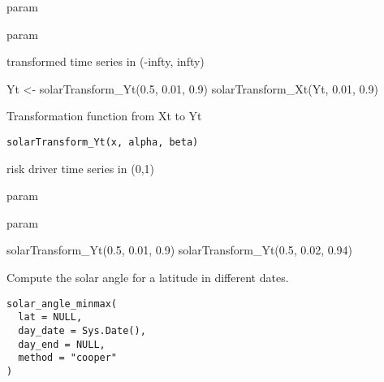 \documentclass[a4paper]{book}
\begin{document}
%
\begin{Arguments}
\begin{ldescription}
\item[\code{alpha}] param

\item[\code{beta}] param

\item[\code{y}] transformed time series in (-infty, infty)
\end{ldescription}
\end{Arguments}
%
\begin{Examples}
\begin{ExampleCode}
Yt <- solarTransform_Yt(0.5, 0.01, 0.9)
solarTransform_Xt(Yt, 0.01, 0.9)
\end{ExampleCode}
\end{Examples}
%
\begin{Description}\relax
Transformation function from Xt to Yt
\end{Description}
%
\begin{Usage}
\begin{verbatim}
solarTransform_Yt(x, alpha, beta)
\end{verbatim}
\end{Usage}
%
\begin{Arguments}
\begin{ldescription}
\item[\code{x}] risk driver time series in (0,1)

\item[\code{alpha}] param

\item[\code{beta}] param
\end{ldescription}
\end{Arguments}
%
\begin{Examples}
\begin{ExampleCode}
solarTransform_Yt(0.5, 0.01, 0.9)
solarTransform_Yt(0.5, 0.02, 0.94)
\end{ExampleCode}
\end{Examples}
%
\begin{Description}\relax
Compute the solar angle for a latitude in different dates.
\end{Description}
%
\begin{Usage}
\begin{verbatim}
solar_angle_minmax(
  lat = NULL,
  day_date = Sys.Date(),
  day_end = NULL,
  method = "cooper"
)
\end{verbatim}
\end{Usage}
\end{document}
